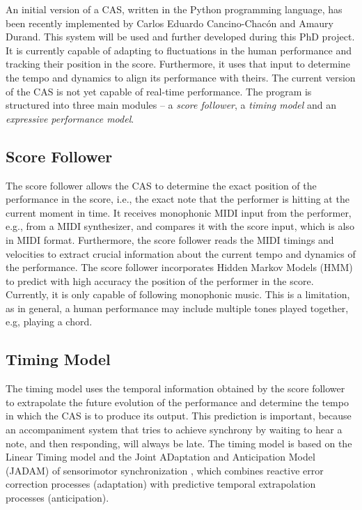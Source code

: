 \documentclass[12pt]{scrartcl}
\begin{document}
An initial version of a CAS, written in the Python programming language, has been recently implemented by Carlos Eduardo Cancino-Chac\'on and Amaury Durand. This system will be used and further developed during this PhD project. It is currently capable of adapting to fluctuations in the human performance and tracking their position in the score. Furthermore, it uses that input to determine the tempo and dynamics to align its performance with theirs. The current version of the CAS is not yet capable of real-time performance. The program is structured into three main modules -- a \textit{score follower}, a \textit{timing model} and an \textit{expressive performance model}. 


\subsection{Score Follower}
\label{score-follower}
The score follower allows the CAS to determine the exact position of the performance in the score, i.e., the exact note that the performer is hitting at the current moment in time. It receives monophonic MIDI input from the performer, e.g., from a MIDI synthesizer, and compares it with the score input, which is also in MIDI format. Furthermore, the score follower reads the MIDI timings and velocities to extract crucial information about the current tempo and dynamics of the performance. The score follower incorporates Hidden Markov Models (HMM) \citep{bishop} to predict with high accuracy the position of the performer in the score. Currently, it is only capable of following monophonic music. This is a limitation, as in general, a human performance may include multiple tones played together, e.g, playing a chord.
  
\subsection{Timing Model}
\label{timing-model}
The timing model uses the temporal information obtained by the score follower to extrapolate the future evolution of the performance and determine the tempo in which the CAS is to produce its output. This prediction is important, because an accompaniment system that tries to achieve synchrony by waiting to hear a note, and then responding, will always be late. The timing model is based on the Linear Timing model \citep{tappingfriend} and the Joint ADaptation and Anticipation Model (JADAM) of sensorimotor synchronization \citep{jadam, jadam2}, which combines reactive error correction processes (adaptation) with predictive temporal extrapolation processes (anticipation). 
  
\end{document}
